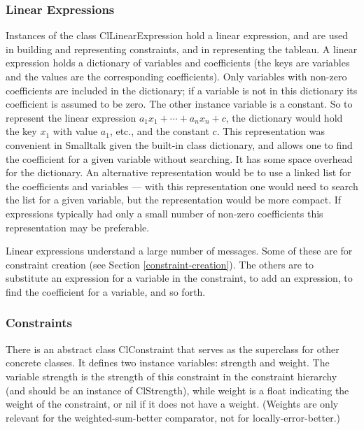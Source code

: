 \documentclass{article}
\begin{document}
\subsubsection{Linear Expressions}

Instances of the class {\sf ClLinearExpression} hold a linear expression,
and are used in building and representing
constraints, and in representing the tableau.  A linear expression holds a
dictionary of variables and coefficients (the keys are variables and the
values are the corresponding coefficients).  Only variables
with non-zero coefficients are included in the dictionary; 
if a variable is not in this
dictionary its coefficient is assumed to be zero.  The other instance
variable is a constant.  So to represent the linear expression 
$a_1 x_1 + \cdots + a_n x_n + c$, the dictionary would hold the key $x_1$
with value $a_1$, etc., and the constant $c$.  This representation was
convenient in Smalltalk given the built-in class dictionary, and allows one
to find the coefficient for a given variable without searching.  It has
some space overhead for the dictionary.  An alternative representation
would be to use a linked list for the coefficients and variables --- with
this representation one would need to search the list for a given variable,
but the representation would be more compact.  If expressions typically had
only a small number of non-zero coefficients this representation may be
preferable.

Linear expressions understand  a large number of messages.  Some of these
are for constraint creation (see Section \ref{constraint-creation}).  The
others are to substitute an expression for a variable in the constraint, to
add an expression, to find the coefficient for a variable, and so forth.

\subsubsection{Constraints}
\label{constraint-classes}

There is an abstract class {\sf ClConstraint} that serves as the superclass
for other concrete classes.  It defines two instance variables: {\sf
strength} and {\sf weight}.  The variable {\sf strength} is the strength of
this constraint in the constraint hierarchy (and should be an instance of
{\sf ClStrength}), while {\sf weight} is a float indicating the weight of
the constraint, or nil if it does not have a weight.  (Weights are only
relevant for the weighted-sum-better comparator, not for
locally-error-better.) 
\end{document}
